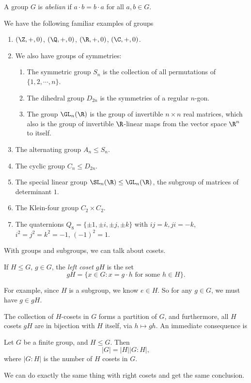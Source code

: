 \documentclass[a4paper]{article}
\begin{document}
\begin{defi}
  A group $G$ is \emph{abelian} if $a\cdot b = b\cdot a$ for all $a, b\in G$.
\end{defi}

\begin{eg}
  We have the following familiar examples of groups
  \begin{enumerate}
    \item $(\Z, +, 0)$, $(\Q, +, 0)$, $(\R, +, 0)$, $(\C, +, 0)$.
    \item We also have groups of symmetries:
      \begin{enumerate}
        \item The symmetric group $S_n$ is the collection of all permutations of $\{1, 2, \cdots, n\}$.
        \item The dihedral group $D_{2n}$ is the symmetries of a regular $n$-gon.
        \item The group $\GL_n(\R)$ is the group of invertible $n\times n$ real matrices, which also is the group of invertible $\R$-linear maps from the vector space $\R^n$ to itself.
      \end{enumerate}
    \item The alternating group $A_n \leq S_n$.
    \item The cyclic group $C_n \leq D_{2n}$.
    \item The special linear group $\SL_n(\R) \leq \GL_n(\R)$, the subgroup of matrices of determinant $1$.
    \item The Klein-four group $C_2 \times C_2$.
    \item The quaternions $Q_8 = \{\pm 1, \pm i, \pm j, \pm k\}$ with $ij = k, ji = -k$, $i^2 = j^2 = k^2 = -1$, $(-1)^2 = 1$.
  \end{enumerate}
\end{eg}

With groups and subgroups, we can talk about cosets.
\begin{defi}[Coset]
  If $H \leq G$, $g \in G$, the \emph{left coset} $gH$ is the set
  \[
    gH = \{x \in G: x = g\cdot h\text{ for some }h \in H\}.
  \]
\end{defi}
For example, since $H$ is a subgroup, we know $e \in H$. So for any $g \in G$, we must have $g \in gH$.

The collection of $H$-cosets in $G$ forms a partition of $G$, and furthermore, all $H$ cosets $gH$ are in bijection with $H$ itself, via $h \mapsto gh$. An immediate consequence is
\begin{thm}
  Let $G$ be a finite group, and $H \leq G$. Then
  \[
    |G| = |H| |G:H|,
  \]
  where $|G:H|$ is the number of $H$ cosets in $G$.
\end{thm}
We can do exactly the same thing with right cosets and get the same conclusion.
\end{document}
